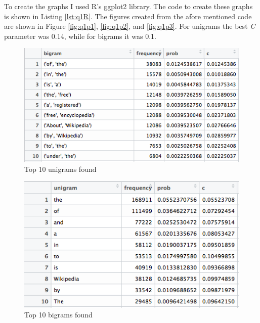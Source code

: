 \documentclass[letterpaper,11pt]{article}
\newcommand*{\srcPath}{../src}%
\begin{document}
 
 
 To create the graphs I used R's ggplot2 library. 
 The code to create these graphs is shown in Listing \ref{lst:q1R}.
 The figures created from the afore mentioned code are shown in Figure \ref{fig:q1p1}, \ref{fig:q1p2}, and \ref{fig:q1p3}.
For unigrams the best \textit{C} parameter was 0.14, while for bigrams it was 0.1.
 
  

  \begin{figure}[h]
  \centering
  \includegraphics[scale=0.6]{unigram_10.png}
  \caption{Top 10 unigrams found}
  \label{fig:q1uni}
  \end{figure}

  \begin{figure}[h]
  \centering
  \includegraphics[scale=0.6]{bigram_10.png}
  \caption{Top 10 bigrams found}
  \label{fig:q1bi}
  \end{figure}
  
\end{document}
